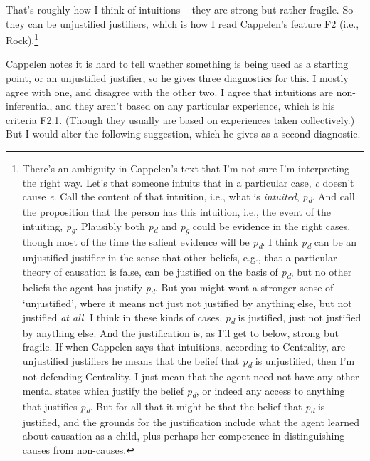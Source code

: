\documentclass[
  10pt,
  letterpaper,
  DIV=11,
  numbers=noendperiod,
  twoside]{scrartcl}
\begin{document}
That's roughly how I think of intuitions -- they are strong but rather
fragile. So they can be unjustified justifiers, which is how I read
Cappelen's feature F2 (i.e., Rock).\footnote{There's an ambiguity in
  Cappelen's text that I'm not sure I'm interpreting the right way.
  Let's that someone intuits that in a particular case, \emph{c} doesn't
  cause \emph{e}. Call the content of that intuition, i.e., what is
  \emph{intuited}, \emph{p\textsubscript{d}}. And call the proposition
  that the person has this intuition, i.e., the event of the intuiting,
  \emph{p\textsubscript{g}}. Plausibly both \emph{p\textsubscript{d}}
  and \emph{p\textsubscript{g}} could be evidence in the right cases,
  though most of the time the salient evidence will be
  \emph{p\textsubscript{d}}. I think \emph{p\textsubscript{d}} can be an
  unjustified justifier in the sense that other beliefs, e.g., that a
  particular theory of causation is false, can be justified on the basis
  of \emph{p\textsubscript{d}}, but no other beliefs the agent has
  justify \emph{p\textsubscript{d}}. But you might want a stronger sense
  of `unjustified', where it means not just not justified by anything
  else, but not justified \emph{at all}. I think in these kinds of
  cases, \emph{p\textsubscript{d}} is justified, just not justified by
  anything else. And the justification is, as I'll get to below, strong
  but fragile. If when Cappelen says that intuitions, according to
  Centrality, are unjustified justifiers he means that the belief that
  \emph{p\textsubscript{d}} is unjustified, then I'm not defending
  Centrality. I just mean that the agent need not have any other mental
  states which justify the belief \emph{p\textsubscript{d}}, or indeed
  any access to anything that justifies \emph{p\textsubscript{d}}. But
  for all that it might be that the belief that
  \emph{p\textsubscript{d}} is justified, and the grounds for the
  justification include what the agent learned about causation as a
  child, plus perhaps her competence in distinguishing causes from
  non-causes.}

Cappelen notes it is hard to tell whether something is being used as a
starting point, or an unjustified justifier, so he gives three
diagnostics for this. I mostly agree with one, and disagree with the
other two. I agree that intuitions are non-inferential, and they aren't
based on any particular experience, which is his criteria F2.1. (Though
they usually are based on experiences taken collectively.) But I would
alter the following suggestion, which he gives as a second diagnostic.
\end{document}
